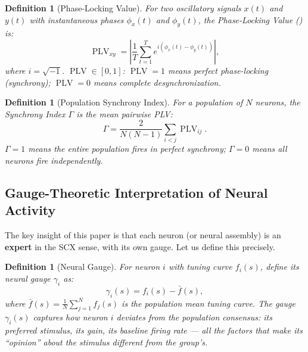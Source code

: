 \documentclass[12pt,a4paper]{article}
\newtheorem{definition}[theorem]{Definition}
\theoremstyle{remark}
\newcommand{\SyncIndex}{\Gamma}
\DeclareMathOperator{\PLV}{PLV}
\begin{document}
\begin{definition}[Phase-Locking Value]\label{def:plv}
For two oscillatory signals $x(t)$ and $y(t)$ with instantaneous phases
$\phi_x(t)$ and $\phi_y(t)$, the Phase-Locking Value (\PLV) is:
\begin{equation}\label{eq:plv-def}
    \PLV_{xy} = \left| \frac{1}{T} \sum_{t=1}^{T} e^{i(\phi_x(t) - \phi_y(t))} \right|,
\end{equation}
where $i = \sqrt{-1}$. $\PLV \in [0, 1]$: $\PLV = 1$ means perfect
phase-locking (synchrony); $\PLV = 0$ means complete desynchronization.
\end{definition}

\begin{definition}[Population Synchrony Index]\label{def:sync-index}
For a population of $N$ neurons, the Synchrony Index $\SyncIndex$ is the
mean pairwise PLV:
\begin{equation}\label{eq:sync-index}
    \SyncIndex = \frac{2}{N(N-1)} \sum_{i < j} \PLV_{ij}.
\end{equation}
$\SyncIndex = 1$ means the entire population fires in perfect synchrony;
$\SyncIndex = 0$ means all neurons fire independently.
\end{definition}

\subsection{Gauge-Theoretic Interpretation of Neural Activity}

The key insight of this paper is that each neuron (or neural assembly) is
an \textbf{expert} in the SCX sense, with its own gauge. Let us define this
precisely.

\begin{definition}[Neural Gauge]\label{def:neural-gauge}
For neuron $i$ with tuning curve $f_i(s)$, define its neural gauge $\gamma_i$ as:
\begin{equation}\label{eq:neural-gauge-def}
    \gamma_i(s) = f_i(s) - \bar{f}(s),
\end{equation}
where $\bar{f}(s) = \frac{1}{N}\sum_{j=1}^{N} f_j(s)$ is the population mean
tuning curve. The gauge $\gamma_i(s)$ captures how neuron $i$ deviates from
the population consensus: its preferred stimulus, its gain, its baseline
firing rate --- all the factors that make its ``opinion'' about the stimulus
different from the group's.
\end{definition}
\end{document}
